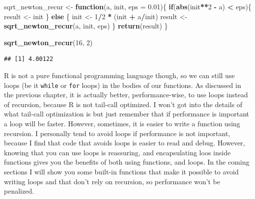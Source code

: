 \documentclass[]{gitbook}
\newenvironment{Shaded}{\begin{snugshade}}{\end{snugshade}}
\newcommand{\ControlFlowTok}[1]{\textcolor[rgb]{0.13,0.29,0.53}{\textbf{#1}}}
\newcommand{\DataTypeTok}[1]{\textcolor[rgb]{0.13,0.29,0.53}{#1}}
\newcommand{\DecValTok}[1]{\textcolor[rgb]{0.00,0.00,0.81}{#1}}
\newcommand{\FloatTok}[1]{\textcolor[rgb]{0.00,0.00,0.81}{#1}}
\newcommand{\KeywordTok}[1]{\textcolor[rgb]{0.13,0.29,0.53}{\textbf{#1}}}
\newcommand{\NormalTok}[1]{#1}
\newcommand{\OperatorTok}[1]{\textcolor[rgb]{0.81,0.36,0.00}{\textbf{#1}}}
\newcommand{\StringTok}[1]{\textcolor[rgb]{0.31,0.60,0.02}{#1}}
\begin{document}
\begin{Shaded}
\begin{Highlighting}[]
\NormalTok{sqrt_newton_recur <-}\StringTok{ }\ControlFlowTok{function}\NormalTok{(a, init, }\DataTypeTok{eps =} \FloatTok{0.01}\NormalTok{)\{}
    \ControlFlowTok{if}\NormalTok{(}\KeywordTok{abs}\NormalTok{(init}\OperatorTok{**}\DecValTok{2} \OperatorTok{-}\StringTok{ }\NormalTok{a) }\OperatorTok{<}\StringTok{ }\NormalTok{eps)\{}
\NormalTok{        result <-}\StringTok{ }\NormalTok{init}
\NormalTok{    \} }\ControlFlowTok{else}\NormalTok{ \{}
\NormalTok{        init <-}\StringTok{ }\DecValTok{1}\OperatorTok{/}\DecValTok{2} \OperatorTok{*}\StringTok{ }\NormalTok{(init }\OperatorTok{+}\StringTok{ }\NormalTok{a}\OperatorTok{/}\NormalTok{init)}
\NormalTok{        result <-}\StringTok{ }\KeywordTok{sqrt_newton_recur}\NormalTok{(a, init, eps)}
\NormalTok{    \}}
    \KeywordTok{return}\NormalTok{(result)}
\NormalTok{\}}
\end{Highlighting}
\end{Shaded}

\begin{Shaded}
\begin{Highlighting}[]
\KeywordTok{sqrt_newton_recur}\NormalTok{(}\DecValTok{16}\NormalTok{, }\DecValTok{2}\NormalTok{)}
\end{Highlighting}
\end{Shaded}

\begin{verbatim}
## [1] 4.00122
\end{verbatim}

R is not a pure functional programming language though, so we can still use loops (be it \texttt{while} or
\texttt{for} loops) in the bodies of our functions. As discussed in the previous chapter, it is actually
better, performance-wise, to use loops instead of recursion, because R is not tail-call optimized.
I won't got into the details of what tail-call optimization is but just remember that if
performance is important a loop will be faster. However, sometimes, it is easier to write a
function using recursion. I personally tend to avoid loops if performance is not important,
because I find that code that avoids loops is easier to read and debug. However, knowing that
you can use loops is reassuring, and encapsulating loos inside functions gives you the benefits of
both using functions, and loops. In the coming sections I will show you some built-in functions
that make it possible to avoid writing loops and that don't rely on recursion, so performance
won't be penalized.
\end{document}
